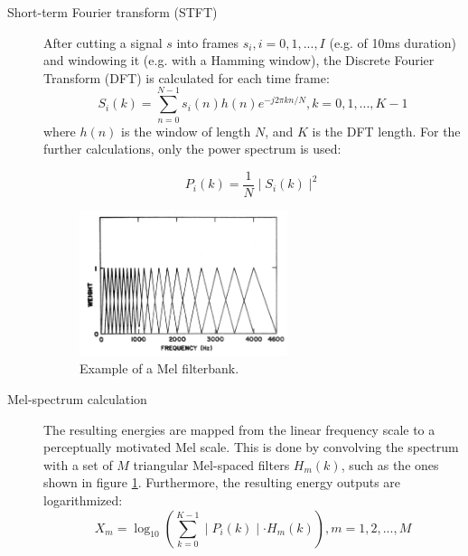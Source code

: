         \begin{description}
            \item[Short-term Fourier transform (STFT)] After cutting a signal $s$ into frames $s_i, i = 0,1,...,I$ (e.g. of 10ms duration) and windowing it (e.g. with a Hamming window), the Discrete Fourier Transform (DFT) is calculated for each time frame:
            \begin{equation}
                S_i(k) = \sum_{n=0}^{N-1} s_i(n)h(n)e^{-j 2\pi kn/N}, k = 0,1,...,K-1
            \end{equation}
            where $h(n)$ is the window of length $N$, and $K$ is the DFT length. For the further calculations, only the power spectrum is used:
            
            \begin{equation}
                P_i(k) = \frac{1}{N} \mid S_i(k) \mid ^2
            \end{equation}

            \begin{figure}
                \begin{center}
                    \includegraphics[width=0.6\textwidth]{figures/mel_filterbanks.png}
                    \caption{Example of a Mel filterbank. \cite{davis_mermelstein}}
                    \label{fig:mel_filterbanks}
                \end{center}
            \end{figure}

            \item[Mel-spectrum calculation] The resulting energies are mapped from the linear frequency scale to a perceptually motivated Mel scale. 
            This is done by convolving the spectrum with a set of $M$ triangular Mel-spaced filters $H_m(k)$, such as the ones shown in figure \ref{fig:mel_filterbanks}. 
            Furthermore, the resulting energy outputs are logarithmized:
            \begin{equation}
                X_m = \log_{10} \left( \sum_{k=0}^{K-1} \mid P_i(k) \mid \cdot H_m(k) \right), m=1,2,...,M
            \end{equation}


\end{description}
